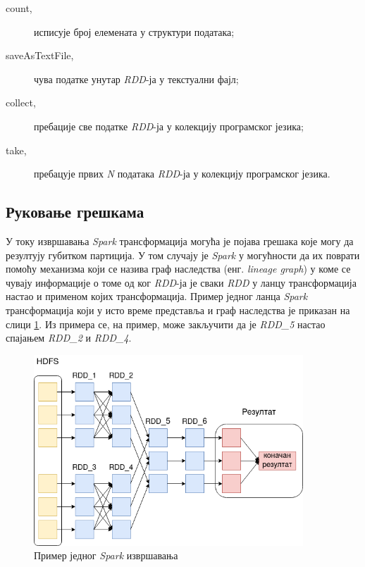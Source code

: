 \documentclass[12pt,oneside]{memoir}
\begin{document}
\begin{description}
	\item[count,] исписује број елемената у структури података;
	\item[saveAsTextFile,] чува податке унутар \textit{RDD}-ја у текстуални фајл;
	\item[collect,] пребације све податке \textit{RDD}-ја у колекцију програмског језика;
	\item[take,] пребацује првих \textit{N} података \textit{RDD}-ја у колекцију програмског језика.
\end{description}

\subsection{Руковање грешкама}
\label{subsec:spark_dags}

У току извршавања \textit{Spark} трансформација могућа је појава грешака које могу да резултују губитком партиција. У том случају је \textit{Spark} у могућности да их поврати помоћу механизма који се назива граф наследства (енг. \textit{lineage graph}) у коме се чувају информације о томе од ког \textit{RDD}-ја је сваки \textit{RDD} у ланцу трансформација настао и применом којих трансформација. Пример једног ланца \textit{Spark} трансформација који у исто време представља и граф наследства је приказан на  слици \ref{fig:sprk_ppln}. Из примера се, на пример, може закључити да је \textit{RDD\_5} настао спајањем \textit{RDD\_2} и \textit{RDD\_4}.

\begin{figure}[!ht]
  \centering
  \includegraphics[width=0.9\textwidth]{pictures/spark_ppln.png}
  \caption{Пример једног \textit{Spark} извршавања}
  \label{fig:sprk_ppln}
\end{figure}
\end{document}
